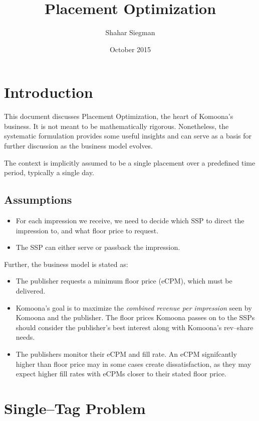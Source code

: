 \documentclass{article}
\title{Placement Optimization}
\author{Shahar Siegman}
\date{October 2015}
\begin{document}
\raggedright
\begin{large}

\maketitle

\section{Introduction}

This document discusses Placement Optimization, the heart of Komoona's business. It is not meant to be mathematically rigorous. Nonetheless, the systematic formulation provides some useful insights and can serve as a basis for further discussion as the business model evolves.

The context is implicitly assumed to be a single placement over a predefined time period, typically a single day.

\subsection{Assumptions}
\begin{itemize}
\item
For each impression we receive, we need to decide which SSP to direct the impression to, and what floor price to request.
\item
The SSP can either serve or passback the impression. 
\end{itemize}

Further, the business model is stated as:
\begin{itemize}
\item 
The publisher requests a minimum floor price (eCPM), which must be delivered.
\item
Komoona's goal is to maximize the \emph{combined revenue per impression} seen by Komoona and the publisher. The floor prices Komoona passes on to the SSPs should consider the publisher's best interest along with Komoona's rev--share needs.
\item
The publishers monitor their eCPM and fill rate. An eCPM signifcantly higher than floor price may in some cases create dissatisfaction, as they may expect higher fill rates with eCPMs closer to their stated floor price. 
\end{itemize}


\section{Single--Tag Problem}

\end{large}
\end{document}
